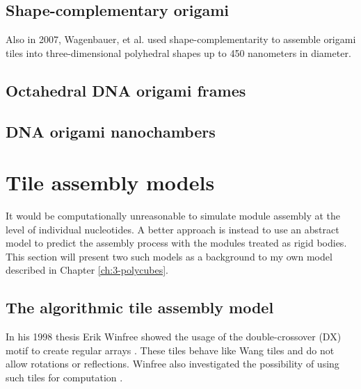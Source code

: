\subsection{Shape-complementary origami}

Also in 2007, Wagenbauer, et al. \cite{wagenbauer2017gigadalton} used shape-complementarity to assemble origami tiles into three-dimensional polyhedral shapes up to 450 nanometers in diameter.

\subsection{Octahedral DNA origami frames}

\subsection{DNA origami nanochambers}

\section{Tile assembly models}
It would be computationally unreasonable to simulate module assembly at the level of individual nucleotides. A better approach is instead to use an abstract model to predict the assembly process with the modules treated as rigid bodies. This section will present two such models as a background to my own model described in Chapter \ref{ch:3-polycubes}.


\subsection{The algorithmic tile assembly model}


In his 1998 thesis Erik Winfree showed the usage of the double-crossover (DX) motif to create regular arrays \cite{winfree1998design}. These tiles behave like Wang tiles\cite{wang1961proving} and do not allow rotations or reflections. Winfree also investigated the possibility of using such tiles for computation \cite{winfree1998algorithmic}.

